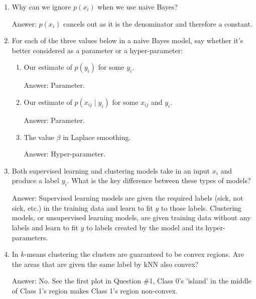 \documentclass{article}
\newenvironment{answer}{\par\begingroup\color{gre}Answer: }{\endgroup}
\begin{document}
\begin{enumerate}
\begin{answer}
        \end{answer}
        \item Why can we ignore $p(x_i)$ when we use naive Bayes?
        \begin{answer}
        $p(x_i)$ cancels out as it is the denominator and therefore a constant.
        \end{answer}
        \item For each of the three values below in a naive Bayes model, say whether it's better considered as a parameter or a hyper-parameter:
        \begin{enumerate}
            \item Our estimate of $p(y_i)$ for some $y_i$.
            \begin{answer}
            Parameter.
            \end{answer}
            \item Our estimate of $p(x_{ij} \mid y_i)$ for some $x_{ij}$ and $y_i$.
            \begin{answer}
            Parameter.
            \end{answer}
            \item The value $\beta$ in Laplace smoothing.
            \begin{answer}
            Hyper-parameter.
            \end{answer}
        \end{enumerate}
        \item Both supervised learning and clustering models take in an input $x_i$ and produce a label $y_i$. What is the key difference between these types of models?
        \begin{answer}
        Supervised learning models are given the required labels (sick, not sick, etc.) in the training data and learn to fit $y$ to those labels. Clustering models, or unsupervised learning models, are given training data without any labels and learn to fit $y$ to labels created by the model and its hyper-parameters.
        \end{answer}
        \item In $k$-means clustering the clusters are guaranteed to be convex regions. Are the areas that are given the same label by kNN also convex?
        \begin{answer}
        No. See the first plot in Question \#1, Class 0's 'island' in the middle of Class 1's region makes Class 1's region non-convex.
        \end{answer}
    \end{enumerate}
\end{document}
